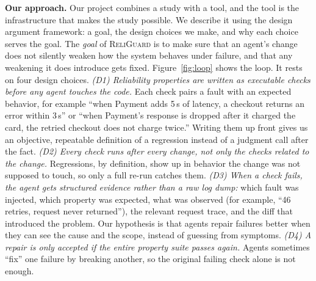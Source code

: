 \documentclass[sigconf,review]{acmart}
\begin{document}
\textbf{Our approach.} Our project combines a study with a tool, and
the tool is the infrastructure that makes the study possible. We
describe it using the design argument framework: a goal, the design
choices we make, and why each choice serves the goal. The \emph{goal}
of \textsc{ReliGuard} is to make sure that an agent's change does not
silently weaken how the system behaves under failure, and that
any weakening it does introduce gets fixed. Figure~\ref{fig:loop} shows the
loop. It rests on four design choices. \emph{(D1) Reliability properties are
written as executable checks before any agent touches the code.} Each
check pairs a fault with an expected behavior, for example ``when
Payment adds 5\,s of latency, a checkout returns an error within
3\,s'' or ``when Payment's response is dropped after it charged the
card, the retried checkout does not charge twice.'' Writing them
up front gives us an objective, repeatable definition of a regression
instead of a judgment call after the fact. \emph{(D2) Every check runs after
every change, not only the checks related to the change.} Regressions,
by definition, show up in behavior the change was not supposed
to touch, so only a full re-run catches them. \emph{(D3) When a check
fails, the agent gets structured evidence rather than a raw log dump:}
which fault was injected, which property was expected, what was
observed (for example, ``46 retries, request never returned''), the
relevant request trace, and the diff that introduced the problem. Our
hypothesis is that agents repair failures better when they can see
the cause and the scope, instead of guessing from symptoms. \emph{(D4) A
repair is only accepted if the entire property suite passes again.} Agents
sometimes ``fix'' one failure by breaking another, so the original
failing check alone is not enough.
\end{document}

